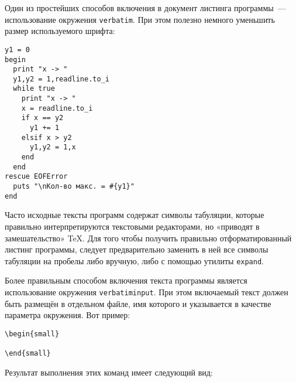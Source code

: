 Один из простейших способов включения в документ листинга программы~---
использование окружения \verb|verbatim|. При этом полезно немного
уменьшить размер используемого шрифта:

\begin{small}
\begin{verbatim}
y1 = 0
begin
  print "x -> "
  y1,y2 = 1,readline.to_i
  while true
    print "x -> "
    x = readline.to_i
    if x == y2
      y1 += 1
    elsif x > y2
      y1,y2 = 1,x
    end
  end
rescue EOFError
  puts "\nКол-во макс. = #{y1}"
end
\end{verbatim}
\end{small}

Часто исходные тексты программ содержат символы табуляции, которые
правильно интерпретируются текстовыми редакторами, но «приводят в
замешательство» \TeX. Для того чтобы получить правильно отформатированный
листинг программы, следует предварительно заменить в ней все символы табуляции
на пробелы либо вручную, либо с помощью утилиты \verb|expand|.

Более правильным способом включения текста программы является использование
окружения \verb|verbatiminput|. При этом
включаемый текст должен быть размещён в отдельном файле, имя которого и
указывается в качестве параметра окружения. Вот пример:

\begin{small}
\begin{verbatim}
\begin{small}

\end{small}
\end{verbatim}
\end{small}

Результат выполнения этих команд имеет следующий вид:

\begin{small}

\end{small}
